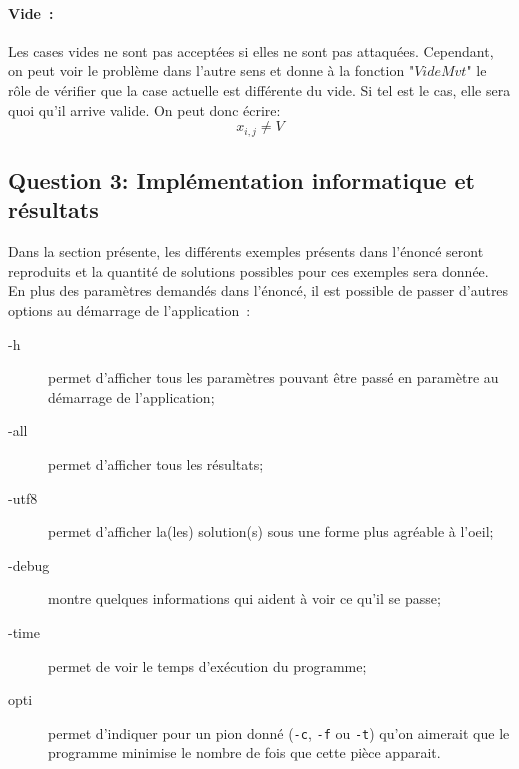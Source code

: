 \documentclass[a4paper,11pt]{article}
\begin{document}
          \paragraph{Vide~:}
          	Les cases vides ne sont pas acceptées si elles ne sont pas attaquées.  Cependant, on peut voir le problème dans l'autre sens et donne à la fonction "$VideMvt$" le rôle de vérifier que la case actuelle est différente du vide.  Si tel est le cas, elle sera quoi qu'il arrive valide.  On peut donc écrire:
            \[x_{i, j} \neq V\]

    \subsection{Question 3: Implémentation informatique et résultats}
    	Dans la section présente, les différents exemples présents dans l'énoncé seront reproduits et la quantité de solutions possibles pour ces exemples sera donnée.\\
        En plus des paramètres demandés dans l'énoncé, il est possible de passer d'autres options au démarrage de l'application~:
        \begin{description}
        	\item[-h] permet d'afficher tous les paramètres pouvant être passé en paramètre au démarrage de l'application;
        	\item[-all] permet d'afficher tous les résultats;
            \item[-utf8] permet d'afficher la(les) solution(s) sous une forme plus agréable à l'oeil;
            \item[-debug] montre quelques informations qui aident à voir ce qu'il se passe;
            \item[-time] permet de voir le temps d'exécution du programme;
            \item[opti] permet d'indiquer pour un pion donné (\verb|-c|, \verb|-f| ou \verb|-t|) qu'on aimerait que le programme minimise le nombre de fois que cette pièce apparait.
        \end{description}
        
\end{document}
